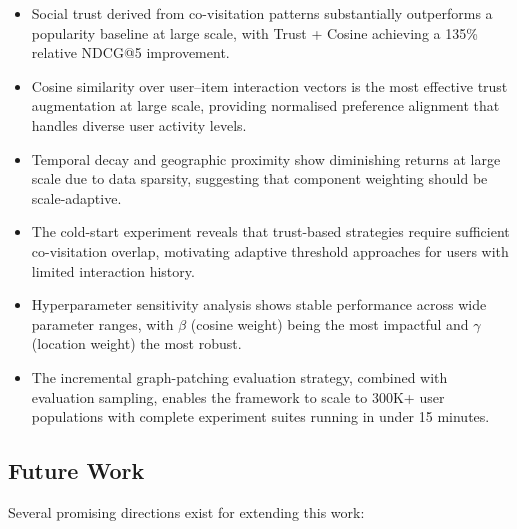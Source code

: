 \documentclass[conference]{IEEEtran}
\begin{document}
\begin{itemize}
  \item Social trust derived from co-visitation patterns substantially
        outperforms a popularity baseline at large scale, with Trust +
        Cosine achieving a 135\% relative NDCG@5 improvement.
  \item Cosine similarity over user--item interaction vectors is the
        most effective trust augmentation at large scale, providing
        normalised preference alignment that handles diverse user
        activity levels.
  \item Temporal decay and geographic proximity show diminishing returns
        at large scale due to data sparsity, suggesting that component
        weighting should be scale-adaptive.
  \item The cold-start experiment reveals that trust-based strategies
        require sufficient co-visitation overlap, motivating adaptive
        threshold approaches for users with limited interaction history.
  \item Hyperparameter sensitivity analysis shows stable performance
        across wide parameter ranges, with $\beta$ (cosine weight)
        being the most impactful and $\gamma$ (location weight) the
        most robust.
  \item The incremental graph-patching evaluation strategy, combined
        with evaluation sampling, enables the framework to scale to
        300K+ user populations with complete experiment suites running
        in under 15 minutes.
\end{itemize}

\subsection{Future Work}
\label{sec:future}

Several promising directions exist for extending this work:
\end{document}
